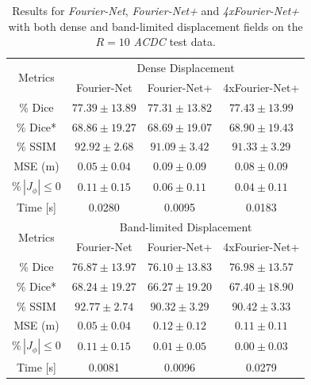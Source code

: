 \begin{table}[h] %
	\centering
	\caption{Results for \emph{Fourier-Net}, \emph{Fourier-Net+} and \emph{4xFourier-Net+} with both dense and band-limited displacement fields on the $R=10$ \emph{ACDC} test data.}
	\label{tab:DenseDisplacementAcc10}
	\begin{tabular}{c c c c} %
		\toprule
		\multirow{2}{*}{Metrics} & \multicolumn{3}{c}{Dense Displacement} \\
		\cmidrule(lr){2-4} 
		 & Fourier-Net & Fourier-Net+ & 4xFourier-Net+\\	
		\midrule
		$\%$ Dice & $77.39 \pm 13.89$ & $77.31 \pm 13.82$ & $77.43 \pm 13.99$\\
		$\%$ Dice* & $68.86 \pm 19.27$ & $68.69 \pm 19.07$ & $68.90 \pm 19.43$ \\
		$\%$ SSIM & $92.92 \pm 2.68$ & $91.09 \pm 3.42$ & $91.33 \pm 3.29$\\
		MSE (m) & $0.05 \pm 0.04$ & $0.09 \pm 0.09$ & $0.08 \pm 0.09$ \\
		$\% \, |J_{\phi}|\leq0$ & $0.11 \pm 0.15$ & $0.06 \pm 0.11$ & $0.04 \pm 0.11$ \\
		Time [s] 	  & 0.0280 & 0.0095 & 0.0183  \\
		\midrule
		\multirow{2}{*}{Metrics} & \multicolumn{3}{c}{Band-limited Displacement} \\
		\cmidrule(lr){2-4} 
		 & Fourier-Net & Fourier-Net+ & 4xFourier-Net+\\		
		\midrule
		$\%$ Dice & $76.87 \pm 13.97$ & $76.10 \pm 13.83$ & $76.98 \pm 13.57$\\
		$\%$ Dice* & $68.24 \pm 19.27$ & $66.27 \pm 19.20$ & $67.40 \pm 18.90$ \\
		$\%$ SSIM & $92.77 \pm 2.74$ & $90.32 \pm 3.29$ & $90.42 \pm 3.33$\\
		MSE (m) & $0.05 \pm 0.04$ & $0.12 \pm 0.12$ & $0.11 \pm 0.11$ \\
		$\% \, |J_{\phi}|\leq0$ & $0.11 \pm 0.15$ & $0.01 \pm 0.05$ & $0.00 \pm 0.03$ \\
		Time [s] 	  & 0.0081 & 0.0096 & 0.0279  \\
		\bottomrule
	\end{tabular}	
\end{table}
 
